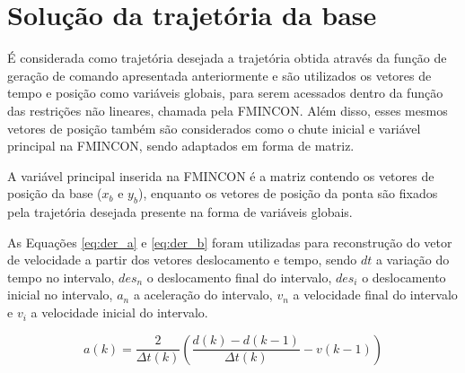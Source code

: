 
\section{Solução da trajetória da base}

É considerada como trajetória desejada a trajetória obtida através da função de geração de comando apresentada anteriormente e são utilizados os vetores de tempo e posição como variáveis globais, para serem acessados dentro da função das restrições não lineares, chamada pela FMINCON. Além disso, esses mesmos vetores de posição também são considerados como o chute inicial e variável principal
na FMINCON, sendo adaptados em forma de matriz.

A variável principal inserida na FMINCON é a matriz contendo os vetores de posição da base ($x_b$ e $y_b$), enquanto os vetores de posição da ponta são fixados pela trajetória desejada presente na forma de variáveis globais.

As Equações \ref{eq:der_a} e \ref{eq:der_b} foram utilizadas para reconstrução do vetor de velocidade a partir dos vetores deslocamento e tempo, sendo $dt$ a variação do tempo no intervalo, $des_n$ o deslocamento final do intervalo, $des_i$ o deslocamento inicial no intervalo, $a_n$ a aceleração do intervalo, $v_n$ a velocidade final do intervalo e $v_i$ a velocidade inicial do intervalo. 


\begin{equation}
    \label{eq:der_a}      
        a(k) = \frac{2}{\Delta t(k)} \left( \frac{d(k)-d(k-1)}{\Delta t(k)}-v(k-1) \right)
\end{equation}

